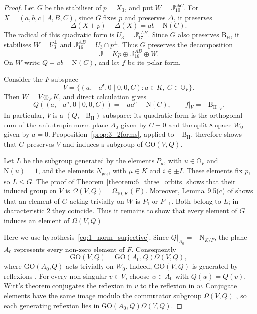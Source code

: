 \documentclass{amsart}
\def\NN{\mathord{\mathrm{N}}}
\def\OO{\mathord{\mathbb{O}}}
\newcommand{\GO}{\mathrm{GO}}
\newcommand{\J}{\mathbb{J}}
\newcommand{\B}{\mathrm{B}}
\renewcommand{\H}{\mathrm{H}}
\newcommand{\s}{\sigma}
\newcommand{\fdet}{\Delta}
\theoremstyle{plain}
\numberwithin{theorem}{section}
\theoremstyle{definition}
\begin{document}
\begin{proof}
	Let $G$ be the stabiliser of $p=X_3$, and put $W=\J_{10}^{abC}$.
	For $X=(a,b,c\mid A,B,C)$, since $G$ fixes $p$ and preserves $\fdet$,
	it preserves
	\[
		\fdet(X+p)-\fdet(X)=ab-\NN(C).
	\]
	The radical of this quadratic form is $U_3=\J_{17}^{cAB}$.
	Since $G$ also preserves $\B_{\H}$, it stabilises
	$W=U_3^\perp$ and $\J_{16}^{AB}=U_3\cap p^\perp$.
	Thus $G$ preserves the decomposition
	\[
		\J=Kp\oplus\J_{16}^{AB}\oplus W.
	\]
	On $W$ write $Q=ab-\NN(C)$, and let $f$ be its polar form.

	Consider the $F$-subspace
	\[
		V=\{(a,-a^{\s},0\mid0,0,C):a\in K,\ C\in\OO_F\}.
	\]
	Then $W=V\otimes_F K$, and direct calculation gives
	\[
		Q((a,-a^{\s},0\mid0,0,C))=-aa^{\s}-\NN(C),
		\qquad f|_V=-\B_{\H}|_V.
	\]
	In particular, $V$ is a $(Q,-\B_{\H})$-subspace: its quadratic form
	is the orthogonal sum of the anisotropic norm plane $A_0$ given by
	$C=0$ and the split $8$-space $W_0$ given by $a=0$.
	Proposition~\ref{prop:3_2forms}, applied to $-\B_{\H}$, therefore
	shows that $G$ preserves $V$ and induces a subgroup of $\GO(V,Q)$.

	Let $L$ be the subgroup generated by the elements $P_u$, with
	$u\in\OO_F$ and $\NN(u)=1$, and the elements $N_{\mu e_i}$, with
	$\mu\in K$ and $i\in\pm I$. These elements fix $p$, so $L\leqslant G$.
	The proof of Theorem~\ref{theorem:6_three_orbits} shows that their
	induced group on $V$ is $\Omega(V,Q)=\Omega_{10,K}^{-}(F)$.
	Moreover, Lemma~9.5(c) of \cite{BSW1} shows that an element of $G$
	acting trivially on $W$ is $P_1$ or $P_{-1}$. Both belong to $L$;
	in characteristic $2$ they coincide. Thus it remains to show that
	every element of $G$ induces an element of $\Omega(V,Q)$.

	Here we use hypothesis~\eqref{eq:1_norm_surjective}.
	Since $Q|_{A_0}=-\NN_{K/F}$, the plane $A_0$ represents every
	non-zero element of $F$. Consequently
	\[
		\GO(V,Q)=\GO(A_0,Q)\Omega(V,Q),
	\]
	where $\GO(A_0,Q)$ acts trivially on $W_0$.
	Indeed, $\GO(V,Q)$ is generated by reflexions
	\cite[Corollary~11.42]{Taylor}. For every non-singular $v\in V$,
	choose $w\in A_0$ with $Q(w)=Q(v)$. Witt's theorem conjugates the
	reflexion in $v$ to the reflexion in $w$. Conjugate elements have
	the same image modulo the commutator subgroup
	$\Omega(V,Q)$ \cite[Theorem~11.45]{Taylor}, so each generating reflexion lies in
	$\GO(A_0,Q)\Omega(V,Q)$.


\end{proof}
\end{document}
